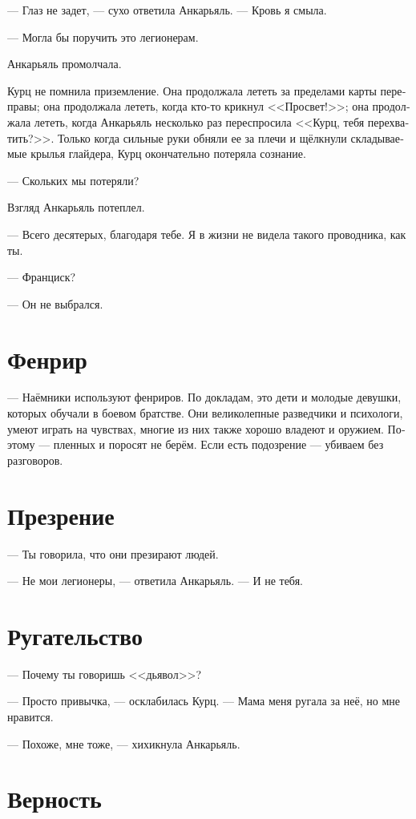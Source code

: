 \documentclass[a4paper,12pt,fleqn]{book}\usepackage{polyglossia}\setdefaultlanguage[babelshorthands=true]{russian}\setotherlanguage{english}\defaultfontfeatures{Ligatures=TeX,Mapping=tex-text}\usepackage{xcolor}\newcommand{\ml}[3]{#2}
\begin{document}
--- Глаз не задет, --- сухо ответила Анкарьяль.
--- Кровь я смыла.

--- Могла бы поручить это легионерам.

Анкарьяль промолчала.

Курц не помнила приземление.
Она продолжала лететь за пределами карты переправы;
она продолжала лететь, когда кто-то крикнул <<Просвет!>>;
она продолжала лететь, когда Анкарьяль несколько раз переспросила <<Курц, тебя перехватить?>>.
Только когда сильные руки обняли ее за плечи и щёлкнули складываемые крылья глайдера, Курц окончательно потеряла сознание.

--- Скольких мы потеряли?

Взгляд Анкарьяль потеплел.

--- Всего десятерых, благодаря тебе.
Я в жизни не видела такого проводника, как ты.

--- Франциск?

\ml{$0$}
{--- Он не выбрался.}
{``He didn't make it.''}

\section{Фенрир}

--- Наёмники используют фенриров.
По докладам, это дети и молодые девушки, которых обучали в боевом братстве.
Они великолепные разведчики и психологи, умеют играть на чувствах, многие из них также хорошо владеют и оружием.
Поэтому --- пленных и поросят не берём.
Если есть подозрение --- убиваем без разговоров.

\section{Презрение}

--- Ты говорила, что они презирают людей.

--- Не мои легионеры, --- ответила Анкарьяль.
--- И не тебя.

\section{Ругательство}

--- Почему ты говоришь <<дьявол>>?

--- Просто привычка, --- осклабилась Курц.
--- Мама меня ругала за неё, но мне нравится.

--- Похоже, мне тоже, --- хихикнула Анкарьяль.

\section{Верность}
\end{document}

